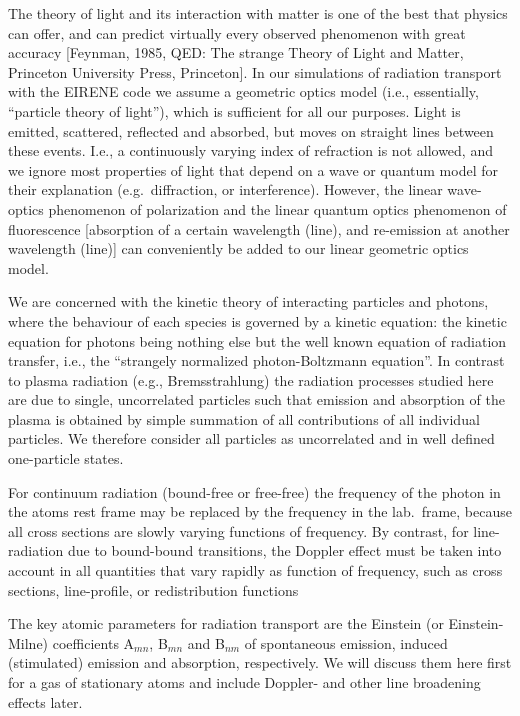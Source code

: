 The theory of light and its interaction with matter is one of the best that
physics can offer, and can predict virtually every observed phenomenon with
great accuracy [Feynman, 1985, QED: The strange Theory of Light and Matter,
    Princeton University Press, Princeton].
In our simulations of radiation transport with the EIRENE code we assume a
geometric optics model (i.e., essentially, ``particle theory of light''), which
is sufficient for all our purposes.
Light is emitted, scattered, reflected and absorbed, but moves on straight
lines between these events.
I.e., a continuously varying index of refraction is not allowed, and we ignore
most properties of light that depend on a wave or quantum model for their
explanation (e.g.\ diffraction, or interference).
However, the linear wave-optics phenomenon of polarization and the linear
quantum optics phenomenon of fluorescence [absorption of a certain wavelength
    (line), and re-emission at another wavelength (line)] can conveniently be added
to our linear geometric optics model.

We are concerned with the kinetic theory of interacting particles and photons,
where the behaviour of each species is governed by a kinetic equation: the
kinetic equation for photons being nothing else but the well known equation of
radiation transfer, i.e., the ``strangely normalized photon-Boltzmann
equation''.
In contrast to plasma radiation (e.g., Bremsstrahlung) the radiation processes
studied here are due to single, uncorrelated particles such that emission and
absorption of the plasma is obtained by simple summation of all contributions
of all individual particles.
We therefore consider all particles as uncorrelated and in well defined
one-particle states.

For continuum radiation (bound-free or free-free) the frequency of the photon
in the atoms rest frame may be replaced by the frequency in the lab.\ frame,
because all cross sections are slowly varying functions of frequency.
By contrast, for line-radiation due to bound-bound transitions, the Doppler
effect must be taken into account in all quantities that vary rapidly as
function of frequency, such as cross sections, line-profile, or redistribution
functions  

The key atomic parameters for radiation transport are the Einstein (or
Einstein-Milne) coefficients A$_{mn}$, B$_{mn}$ and B$_{nm}$ of spontaneous
emission, induced (stimulated) emission and absorption, respectively.
We will discuss them here first for a gas of stationary atoms and include
Doppler- and other line broadening effects later.

